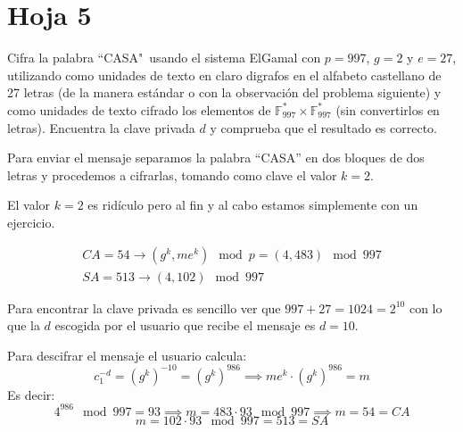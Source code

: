 \section{Hoja 5}
\begin{problem}[1]
Cifra la palabra ``CASA"\ usando el sistema ElGamal con  $p=997$, $g=2$ y $e=27$, utilizando como unidades de texto en claro digrafos  en el alfabeto castellano de 27 letras (de la manera estándar o con la observación del problema siguiente) y como unidades de texto cifrado los elementos de $\mathbb{F}_{997}^* \times \mathbb{F}_{997}^*$ (sin convertirlos en letras). Encuentra la clave privada $d$ y comprueba que el resultado es correcto.

\solution


Para enviar el mensaje separamos la palabra ``CASA'' en dos bloques de dos letras y procedemos a cifrarlas, tomando como clave el valor $k=2$.

\obs El valor $k=2$ es ridículo pero al fin y al cabo estamos simplemente con un ejercicio.

\[\begin{array}{l}
CA = 54 \to (g^k,me^k) \mod p = (4,483) \mod 997 \\
SA = 513 \to (4, 102) \mod 997
\end{array}\]

Para encontrar la clave privada es sencillo ver que $997+27 = 1024 = 2^{10}$ con lo que la $d$ escogida por el usuario que recibe el mensaje es $d=10$.

Para descifrar el mensaje el usuario calcula:
\[c_1^{-d} = (g^k)^{-10} =(g^k)^{986} \implies me^k\cdot (g^k)^{986} = m\]
Es decir:
\[4^{986} \mod 997 = 93 \implies m = 483 \cdot 93 \mod 997 \implies m=54 = CA\]
\[m = 102 \cdot 93 \mod 997 = 513 =SA\]

\end{problem}


